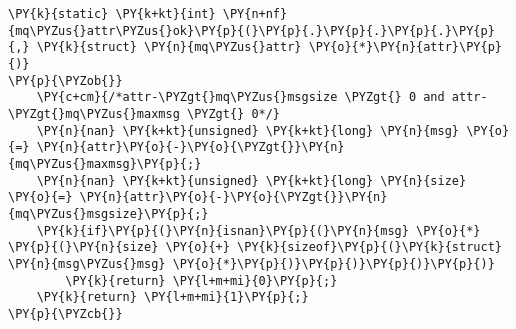 \begin{Verbatim}[commandchars=\\\{\},codes={\catcode`\$=3\catcode`\^=7\catcode`\_=8}]
\PY{k}{static} \PY{k+kt}{int} \PY{n+nf}{mq\PYZus{}attr\PYZus{}ok}\PY{p}{(}\PY{p}{.}\PY{p}{.}\PY{p}{.}\PY{p}{,} \PY{k}{struct} \PY{n}{mq\PYZus{}attr} \PY{o}{*}\PY{n}{attr}\PY{p}{)}
\PY{p}{\PYZob{}}
    \PY{c+cm}{/*attr-\PYZgt{}mq\PYZus{}msgsize \PYZgt{} 0 and attr-\PYZgt{}mq\PYZus{}maxmsg \PYZgt{} 0*/}
    \PY{n}{nan} \PY{k+kt}{unsigned} \PY{k+kt}{long} \PY{n}{msg} \PY{o}{=} \PY{n}{attr}\PY{o}{-}\PY{o}{\PYZgt{}}\PY{n}{mq\PYZus{}maxmsg}\PY{p}{;}
    \PY{n}{nan} \PY{k+kt}{unsigned} \PY{k+kt}{long} \PY{n}{size} \PY{o}{=} \PY{n}{attr}\PY{o}{-}\PY{o}{\PYZgt{}}\PY{n}{mq\PYZus{}msgsize}\PY{p}{;}
    \PY{k}{if}\PY{p}{(}\PY{n}{isnan}\PY{p}{(}\PY{n}{msg} \PY{o}{*} \PY{p}{(}\PY{n}{size} \PY{o}{+} \PY{k}{sizeof}\PY{p}{(}\PY{k}{struct} \PY{n}{msg\PYZus{}msg} \PY{o}{*}\PY{p}{)}\PY{p}{)}\PY{p}{)}\PY{p}{)}
        \PY{k}{return} \PY{l+m+mi}{0}\PY{p}{;}
    \PY{k}{return} \PY{l+m+mi}{1}\PY{p}{;}
\PY{p}{\PYZcb{}}
\end{Verbatim}
